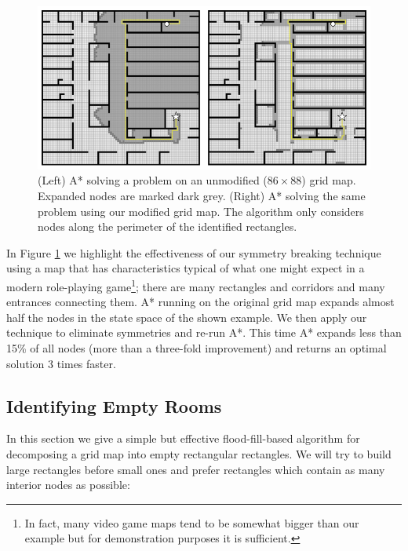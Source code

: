 \begin{figure}[t]
\centering
\includegraphics[width=0.95\columnwidth, trim = 10mm 10mm 10mm 0mm]{chapter_rsr/diagrams/rsr_example.png}
\caption[Searching with A{*} vs. A{*} + RSR] 
{\small
(Left) A* solving a problem on an unmodified ($86\times88$) grid map. 
Expanded nodes are marked dark grey.
(Right) A* solving the same problem using our modified grid map. 
The algorithm only considers nodes along the perimeter of the identified rectangles.}
\label{fig::rsr::contrast}
\end{figure}

In Figure \ref{fig::rsr::contrast} we highlight the effectiveness of our symmetry breaking technique using
a map that has characteristics typical of what one might expect in a modern role-playing game\footnote{
In fact, many video game maps tend to be somewhat bigger than our example but for demonstration 
purposes it is sufficient.};
there are many rectangles and corridors and many entrances connecting them.
A* running on the original grid map expands almost half the nodes
in the state space of the shown example.
We then apply our technique to eliminate symmetries and re-run A*.
This time A* expands less than 15\% of all nodes (more than a three-fold
improvement) and returns an optimal solution 3 times faster.

\subsection{Identifying Empty Rooms}
\label{cha::rsr::rectangles}
In this section we give a simple but effective flood-fill-based algorithm for decomposing a 
grid map into empty rectangular rectangles.
We will try to build large rectangles before small ones and prefer rectangles which
contain as many interior nodes as possible:

